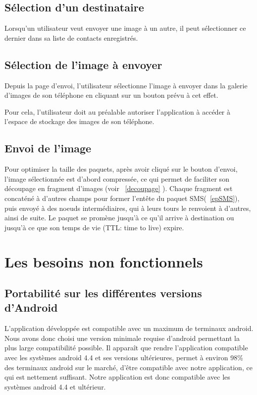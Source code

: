         \subsection{Sélection d'un destinataire}
        
        Lorsqu'un utilisateur veut envoyer une image à un autre, il peut sélectionner ce dernier dans sa liste de contacts enregistrés.
       
        
        
        \subsection{Sélection de l'image à envoyer}
        Depuis la page d'envoi, l'utilisateur sélectionne l'image à envoyer dans la galerie d'images de son téléphone  en cliquant sur un bouton prévu à cet effet. %
        
        Pour cela, l'utilisateur doit au préalable autoriser l'application à accéder à l'espace de stockage des images de son téléphone.
        
        \subsection{Envoi de l'image}
        Pour optimiser la taille des paquets, après avoir cliqué sur le bouton d'envoi, l'image sélectionnée est d'abord compressée, ce qui permet de faciliter son découpage en fragment d'images (voir ~\ref{decoupage} ). Chaque fragment est concaténé à d'autres champs pour former l'entête du paquet SMS(~\ref{epSMS}),  puis envoyé à des noeuds intermédiaires, qui à leurs tours le renvoient à d'autres, ainsi de suite. Le paquet se promène jusqu'à ce qu'il arrive à destination ou jusqu'à ce que son temps de vie (TTL: time to live) expire.
        
       
            

\section{Les besoins non fonctionnels}
        
        \subsection{Portabilité sur les différentes versions d'Android}
            L'application développée est compatible avec un maximum de terminaux android. Nous avons donc choisi une version minimale requise d'android permettant la plus large compatibilité possible. Il apparaît que rendre l'application compatible avec les systèmes android 4.4 et ses versions ultérieures, permet à environ 98\%
            des terminaux android sur le marché, d'être compatible avec notre application, ce qui est nettement suffisant. Notre application est donc compatible avec les systèmes android 4.4 et ultérieur.

